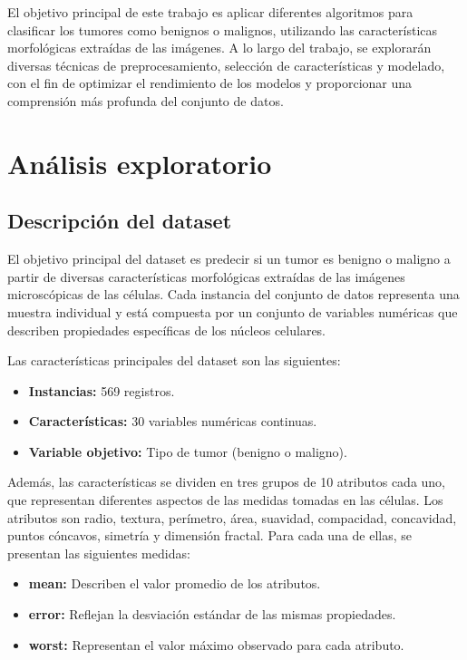 \documentclass[a4paper,12pt]{article}
\begin{document}
El objetivo principal de este trabajo es aplicar diferentes algoritmos para clasificar los tumores como benignos o malignos, utilizando las características morfológicas extraídas de las imágenes. A lo largo del trabajo, se explorarán diversas técnicas de preprocesamiento, selección de características y modelado, con el fin de optimizar el rendimiento de los modelos y proporcionar una comprensión más profunda del conjunto de datos.


\section{Análisis exploratorio}

\subsection{Descripción del dataset}

El objetivo principal del dataset es predecir si un tumor es benigno o maligno a partir de diversas características morfológicas extraídas de las imágenes microscópicas de las células. Cada instancia del conjunto de datos representa una muestra individual y está compuesta por un conjunto de variables numéricas que describen propiedades específicas de los núcleos celulares.

Las características principales del dataset son las siguientes:

\begin{itemize}
    \item \textbf{Instancias:} 569 registros.
    \item \textbf{Características:} 30 variables numéricas continuas.
    \item \textbf{Variable objetivo:} Tipo de tumor (benigno o maligno).
\end{itemize}

Además, las características se dividen en tres grupos de 10 atributos cada uno, que representan diferentes aspectos de las medidas tomadas en las células. Los atributos son radio, textura, perímetro, área, suavidad, compacidad, concavidad, puntos cóncavos, simetría y dimensión fractal. Para cada una de ellas, se presentan las siguientes medidas:

\begin{itemize}
    \item \textbf{mean:} Describen el valor promedio de los atributos.
    \item \textbf{error:} Reflejan la desviación estándar de las mismas propiedades.
    \item \textbf{worst:} Representan el valor máximo observado para cada atributo.
\end{itemize}
\end{document}
